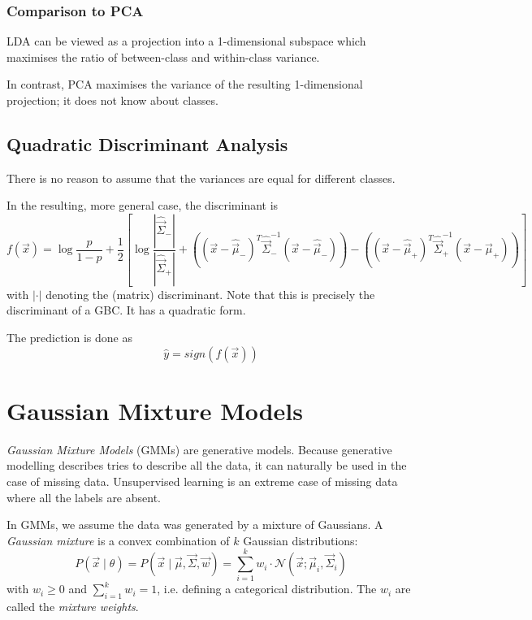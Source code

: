 \subsubsection{Comparison to PCA}
LDA can be viewed as a projection into
a 1-dimensional subspace
which maximises the ratio of
between-class and within-class variance.

In contrast, PCA maximises the
variance of the resulting
1-dimensional projection;
it does not know about classes.


\subsection{Quadratic Discriminant Analysis}
There is no reason to assume that the
variances are equal for different classes.

In the resulting, more general case,
the discriminant is
\begin{equation*}
f(\vec{x}) =
\log{\frac{p}{1-p}} +
\frac{1}{2} \left[
\log{\frac{|\hat{\vec{\Sigma}}_-|}{|\hat{\vec{\Sigma}}_+|}}
+
\left(
(\vec{x}-\hat{\vec{\mu}}_-)^T
\hat{\vec{\Sigma}}_-^{-1}
(\vec{x}-\hat{\vec{\mu}}_-)
\right)
-
\left(
(\vec{x}-\hat{\vec{\mu}}_+)^T
\hat{\vec{\Sigma}}_+^{-1}
(\vec{x}-\hat{\vec{\mu}}_+)
\right)
\right]
\end{equation*}
with $|\cdot|$ denoting the (matrix)
discriminant.
Note that this is precisely the discriminant
of a GBC.
It has a quadratic form.

The prediction is done as
\begin{equation*}
\hat{y} = sign(f(\vec{x}))
\end{equation*}


\section{Gaussian Mixture Models}
\emph{Gaussian Mixture Models} (GMMs) are generative models.
Because generative modelling describes tries to describe all
the data, it can naturally be used in the case of missing data.
Unsupervised learning is an extreme case of missing data
where all the labels are absent.

In GMMs, we assume the data was generated by a mixture of Gaussians.
A \emph{Gaussian mixture} is a convex combination of
$k$ Gaussian distributions:
\begin{equation*}
P(\vec{x} \mid \theta)
= P(\vec{x} \mid \vec{\mu}, \vec{\Sigma}, \vec{w})
= \sum_{i=1}^k{
	w_i \cdot \mathcal{N}(\vec{x} ; \vec{\mu}_i, \vec{\Sigma}_i)
}
\end{equation*}
with $w_i \geq 0$ and $\sum_{i=1}^k{w_i} = 1$,
i.e. defining a categorical distribution.
The $w_i$ are called the \emph{mixture weights}.

